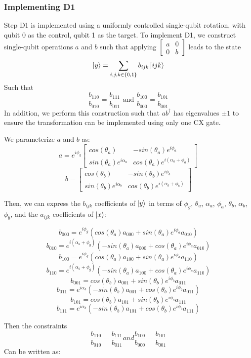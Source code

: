 \documentclass{article}
\begin{document}
\subsubsection{Implementing D1}
Step D1 is implemented using a uniformly controlled single-qubit rotation, with
qubit 0 as the control, qubit 1 as the target. To implement D1, we construct
single-qubit operations $a$ and $b$ such that applying 
$\begin{bmatrix}a&0\\0&b\end{bmatrix}$ leads to the state 
$$\mathinner{|{y}\rangle} = \sum_{i, j, k \in \{0, 1\}}{b_{ijk}\mathinner{|{ijk}\rangle}}$$
Such that
$$\frac{b_{110}}{b_{010}} = \frac{b_{111}}{b_{011}} 
  \text{ and } \frac{b_{100}}{b_{000}} = \frac{b_{101}}{b_{001}}$$
In addition, we perform this construction such that $ab^\dagger$ has eigenvalues
$\pm 1$ to ensure the transformation can be implemented using only one CX gate.

We parameterize $a$ and $b$ as:
$$a = e^{i\phi_g}\begin{bmatrix}cos(\theta_a)&-sin(\theta_a)e^{i\phi_a}\\
  sin(\theta_a)e^{i\alpha_a}&cos(\theta_a)e^{i(\alpha_a + \phi_a)}\end{bmatrix}$$
$$b = \begin{bmatrix}cos(\theta_b)&-sin(\theta_b)e^{i\phi_b}\\
  sin(\theta_b)e^{i\alpha_b}&cos(\theta_b)e^{i(\alpha_b + \phi_b)}\end{bmatrix}$$

Then, we can express the $b_{ijk}$ coefficients of $\mathinner{|{y}\rangle}$ in terms of 
$\phi_g$, $\theta_a$, $\alpha_a$, $\phi_a$, $\theta_b$, $\alpha_b$, $\phi_b$, 
and the $a_{ijk}$ coefficients of $\mathinner{|{x}\rangle}$:

$$b_{000} = e^{i\phi_g}(cos(\theta_a)a_{000} + sin(\theta_a)e^{i\phi_a}a_{010})$$
$$b_{010} = e^{i(\alpha_a + \phi_g)}(-sin(\theta_a)a_{000} + cos(\theta_a)e^{i\phi_a}a_{010})$$
$$b_{100} = e^{i\phi_g}(cos(\theta_a)a_{100} + sin(\theta_a)e^{i\phi_a}a_{110})$$
$$b_{110} = e^{i(\alpha_a + \phi_g)}(-sin(\theta_a)a_{100} + cos(\theta_a)e^{i\phi_a}a_{110})$$
$$b_{001} = cos(\theta_b)a_{001} + sin(\theta_b)e^{i\phi_b}a_{011}$$
$$b_{011} = e^{i\alpha_b}(-sin(\theta_b)a_{001} + cos(\theta_b)e^{i\phi_b}a_{011})$$
$$b_{101} = cos(\theta_b)a_{101} + sin(\theta_b)e^{i\phi_b}a_{111}$$
$$b_{111} = e^{i\alpha_b}(-sin(\theta_b)a_{101} + cos(\theta_b)e^{i\phi_b}a_{111})$$

Then the constraints
$$\frac{b_{110}}{b_{010}} = \frac{b_{111}}{b_{011}} 
  and \frac{b_{100}}{b_{000}} = \frac{b_{101}}{b_{001}}$$
Can be written as:
\end{document}
